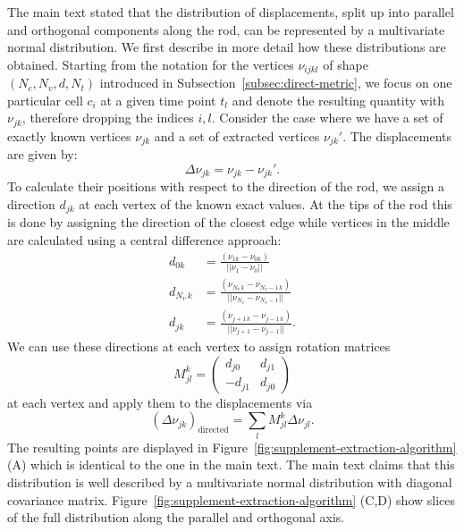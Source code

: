 The main text stated that the distribution of displacements, split up into parallel and orthogonal
components along the rod, can be represented by a multivariate normal distribution.
We first describe in more detail how these distributions are obtained.
Starting from the notation for the vertices $\nu_{ijkl}$ of shape $(N_c,N_v,d,N_t)$ introduced in
Subsection~\ref{subsec:direct-metric}, we focus on one particular cell $c_i$ at a given time point
$t_l$ and denote the resulting quantity with $\nu_{jk}$, therefore dropping the indices $i,l$.
Consider the case where we have a set of exactly known vertices $\nu_{jk}$ and a set of extracted
vertices $\nu_{jk}'$.
The displacements are given by:
\begin{equation}
    \Delta \nu_{jk} = \nu_{jk} - \nu_{jk}'.
\end{equation}
To calculate their positions with respect to the direction of the rod, we assign a
direction $d_{jk}$ at each vertex of the known exact values.
At the tips of the rod this is done by assigning the direction of the closest edge while vertices in
the middle are calculated using a central difference approach:
\begin{align}
    d_{0k} &= \frac{(\nu_{1k}-\nu_{0k})}{||\nu_1 - \nu_0||}\\
    d_{N_v\,k} &= \frac{(\nu_{N_v\,k}-\nu_{N_v-1\,k})}{||\nu_{N_v} - \nu_{N_v-1}||}\\
    d_{jk} &= \frac{(\nu_{j+1\,k}-\nu_{j-1\,k})}{||\nu_{j+1} - \nu_{j-1}||}.
\end{align}
We can use these directions at each vertex to assign rotation matrices
\begin{equation}
    M_{jl}^k = \begin{pmatrix}
        d_{j0} & d_{j1}\\
        -d_{j1} & d_{j0}
    \end{pmatrix}
\end{equation}
at each vertex and apply them to the displacements via
\begin{equation}
    (\Delta\nu_{jk})_\text{directed} = \sum\limits_l M_{jl}^k \Delta\nu_{jl}.
\end{equation}
The resulting points are displayed in Figure~\ref{fig:supplement-extraction-algorithm} (A) which is
identical to the one in the main text.
The main text claims that this distribution is well described by a multivariate normal distribution
with diagonal covariance matrix.
Figure~\ref{fig:supplement-extraction-algorithm} (C,D) show slices of the full distribution along
the parallel and orthogonal axis.
